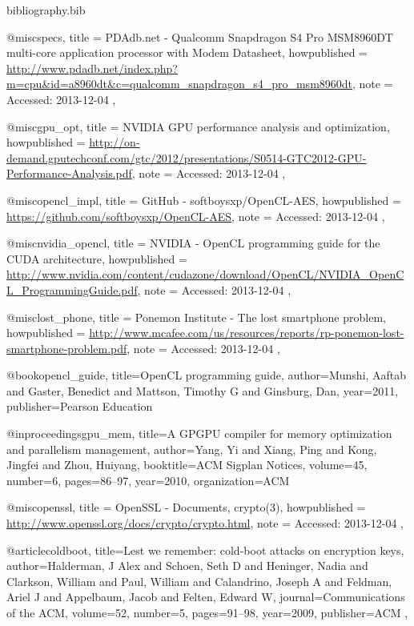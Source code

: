 \documentclass[conference,10pt]{IEEEtran}
\begin{document}
\begin{filecontents*}{bibliography.bib}

    @misc{specs,
        title = {{PDAdb.net -  Qualcomm Snapdragon S4 Pro MSM8960DT multi-core application processor 
        with Modem Datasheet}},
        howpublished = 
        {\url{http://www.pdadb.net/index.php?m=cpu&id=a8960dt&c=qualcomm_snapdragon_s4_pro_msm8960dt}},
        note = {Accessed: 2013-12-04}
    },

    @misc{gpu_opt,
        title = {{NVIDIA GPU performance analysis and optimization}},
        howpublished = 
        {\url{http://on-demand.gputechconf.com/gtc/2012/presentations/S0514-GTC2012-GPU-Performance-Analysis.pdf}},
        note = {Accessed: 2013-12-04}
    },

    @misc{opencl_impl,
        title = {{GitHub -  softboysxp/OpenCL-AES}},
        howpublished = {\url{https://github.com/softboysxp/OpenCL-AES}},
        note = {Accessed: 2013-12-04}
    },

    @misc{nvidia_opencl,
        title = {{NVIDIA -  OpenCL programming guide for the CUDA architecture}},
        howpublished = 
        {\url{http://www.nvidia.com/content/cudazone/download/OpenCL/NVIDIA_OpenCL_ProgrammingGuide.pdf}},
        note = {Accessed: 2013-12-04}
    },

    @misc{lost_phone,
        title = {{Ponemon Institute -  The lost smartphone problem}},
        howpublished = 
        {\url{http://www.mcafee.com/us/resources/reports/rp-ponemon-lost-smartphone-problem.pdf}},
        note = {Accessed: 2013-12-04}
    },

    @book{opencl_guide,
        title={OpenCL programming guide},
        author={Munshi, Aaftab and Gaster, Benedict and Mattson, Timothy G and Ginsburg, Dan},
        year={2011},
        publisher={Pearson Education}
    }

    @inproceedings{gpu_mem,
        title={{A GPGPU compiler for memory optimization and parallelism management}},
        author={Yang, Yi and Xiang, Ping and Kong, Jingfei and Zhou, Huiyang},
        booktitle={ACM Sigplan Notices},
        volume={45},
        number={6},
        pages={86--97},
        year={2010},
        organization={ACM}
    }

    @misc{openssl,
        title = {{OpenSSL} - Documents, crypto(3)},
        howpublished = {\url{http://www.openssl.org/docs/crypto/crypto.html}},
        note = {Accessed: 2013-12-04}
    },

    @article{coldboot,
        title={Lest we remember: cold-boot attacks on encryption keys},
        author={Halderman, J Alex and Schoen, Seth D and Heninger, Nadia and Clarkson, William and Paul, William and Calandrino, Joseph A and Feldman, Ariel J and Appelbaum, Jacob and Felten, Edward W},
        journal={Communications of the ACM},
        volume={52},
        number={5},
        pages={91--98},
        year={2009},
        publisher={ACM}
    },


\end{filecontents*}
\end{document}
